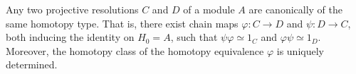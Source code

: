 Any two projective resolutions $C$ and $D$ of a module $A$ are canonically of the same homotopy type. That is, there exist chain maps $\varphi : C \to D$ and $\psi : D \to C$, both inducing the identity on $H_0 = A$, such that $\psi \varphi \simeq 1_C$ and $\varphi \psi \simeq 1_D$. Moreover, the homotopy class of the homotopy equivalence $\varphi$ is uniquely determined.
